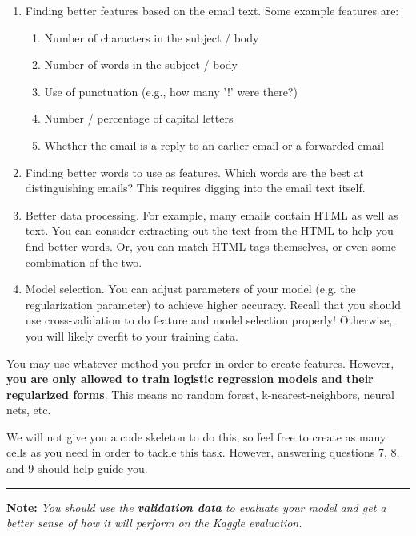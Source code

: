 \documentclass[11pt]{article}
\providecommand{\tightlist}{%
      \setlength{\itemsep}{0pt}\setlength{\parskip}{0pt}}
\begin{document}
\begin{enumerate}
\def\labelenumi{\arabic{enumi}.}
\tightlist
\item
  Finding better features based on the email text. Some example features
  are:

  \begin{enumerate}
  \def\labelenumii{\arabic{enumii}.}
  \tightlist
  \item
    Number of characters in the subject / body
  \item
    Number of words in the subject / body
  \item
    Use of punctuation (e.g., how many '!' were there?)
  \item
    Number / percentage of capital letters
  \item
    Whether the email is a reply to an earlier email or a forwarded
    email
  \end{enumerate}
\item
  Finding better words to use as features. Which words are the best at
  distinguishing emails? This requires digging into the email text
  itself.
\item
  Better data processing. For example, many emails contain HTML as well
  as text. You can consider extracting out the text from the HTML to
  help you find better words. Or, you can match HTML tags themselves, or
  even some combination of the two.
\item
  Model selection. You can adjust parameters of your model (e.g. the
  regularization parameter) to achieve higher accuracy. Recall that you
  should use cross-validation to do feature and model selection
  properly! Otherwise, you will likely overfit to your training data.
\end{enumerate}

You may use whatever method you prefer in order to create features.
However, \textbf{you are only allowed to train logistic regression
models and their regularized forms}. This means no random forest,
k-nearest-neighbors, neural nets, etc.

We will not give you a code skeleton to do this, so feel free to create
as many cells as you need in order to tackle this task. However,
answering questions 7, 8, and 9 should help guide you.

\begin{center}\rule{0.5\linewidth}{\linethickness}\end{center}

\textbf{Note:} \emph{You should use the \textbf{validation data} to
evaluate your model and get a better sense of how it will perform on the
Kaggle evaluation.}
\end{document}
